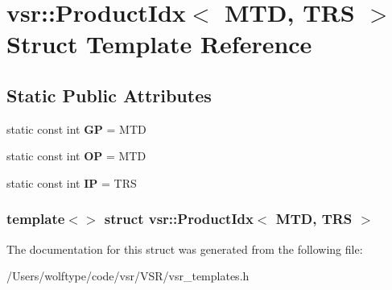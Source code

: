 \hypertarget{structvsr_1_1_product_idx_3_01_m_t_d_00_01_t_r_s_01_4}{\section{vsr\-:\-:Product\-Idx$<$ M\-T\-D, T\-R\-S $>$ Struct Template Reference}
\label{structvsr_1_1_product_idx_3_01_m_t_d_00_01_t_r_s_01_4}
}
\subsection*{Static Public Attributes}
\begin{DoxyCompactItemize}
\item 
\hypertarget{structvsr_1_1_product_idx_3_01_m_t_d_00_01_t_r_s_01_4_a3283ed174830382bddb15343bc7c80fe}{static const int {\bfseries G\-P} = M\-T\-D}\label{structvsr_1_1_product_idx_3_01_m_t_d_00_01_t_r_s_01_4_a3283ed174830382bddb15343bc7c80fe}

\item 
\hypertarget{structvsr_1_1_product_idx_3_01_m_t_d_00_01_t_r_s_01_4_a74024b904ffa6d6c57a56805eed56b4c}{static const int {\bfseries O\-P} = M\-T\-D}\label{structvsr_1_1_product_idx_3_01_m_t_d_00_01_t_r_s_01_4_a74024b904ffa6d6c57a56805eed56b4c}

\item 
\hypertarget{structvsr_1_1_product_idx_3_01_m_t_d_00_01_t_r_s_01_4_ac26ca0d327941a0e029c3284a1bd9efa}{static const int {\bfseries I\-P} = T\-R\-S}\label{structvsr_1_1_product_idx_3_01_m_t_d_00_01_t_r_s_01_4_ac26ca0d327941a0e029c3284a1bd9efa}

\end{DoxyCompactItemize}
\subsubsection*{template$<$$>$ struct vsr\-::\-Product\-Idx$<$ M\-T\-D, T\-R\-S $>$}



The documentation for this struct was generated from the following file\-:\begin{DoxyCompactItemize}
\item 
/\-Users/wolftype/code/vsr/\-V\-S\-R/vsr\-\_\-templates.\-h\end{DoxyCompactItemize}
